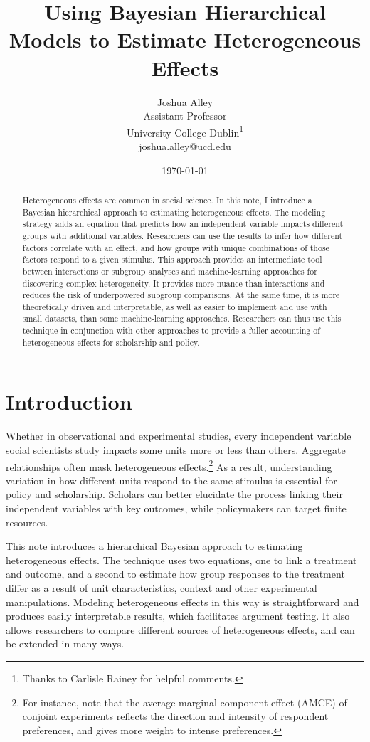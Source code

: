 \documentclass[12pt]{article}
\title{\textbf{Using Bayesian Hierarchical Models to Estimate Heterogeneous Effects}}
\author{Joshua Alley \\
Assistant Professor \\
University College Dublin\thanks{Thanks to Carlisle Rainey for helpful comments.} \\
joshua.alley@ucd.edu
}
\date{\today}
\begin{document}
\maketitle 

\begin{abstract} 
Heterogeneous effects are common in social science. 
In this note, I introduce a Bayesian hierarchical approach to estimating heterogeneous effects. 
The modeling strategy adds an equation that predicts how an independent variable impacts different groups with additional variables.
Researchers can use the results to infer how different factors correlate with an effect, and how groups with unique combinations of those factors respond to a given stimulus. 
This approach provides an intermediate tool between interactions or subgroup analyses and machine-learning approaches for discovering complex heterogeneity. 
It provides more nuance than interactions and reduces the risk of underpowered subgroup comparisons.
At the same time, it is more theoretically driven and interpretable, as well as easier to implement and use with small datasets, than some machine-learning approaches. 
Researchers can thus use this technique in conjunction with other approaches to provide a fuller accounting of heterogeneous effects for scholarship and policy.
\end{abstract} 


\newpage 
\doublespace 


\section{Introduction}


Whether in observational and experimental studies, every independent variable social scientists study impacts some units more or less than others. 
Aggregate relationships often mask heterogeneous effects.\footnote{For instance, \citet{Abramsonetal2022} note that the average marginal component effect (AMCE) of conjoint experiments reflects the direction and intensity of respondent preferences, and gives more weight to intense preferences.} 
As a result, understanding variation in how different units respond to the same stimulus is essential for policy and scholarship. 
Scholars can better elucidate the process linking their independent variables with key outcomes, while policymakers can target finite resources. 


This note introduces a hierarchical Bayesian approach to estimating heterogeneous effects. 
The technique uses two equations, one to link a treatment and outcome, and a second to estimate how group responses to the treatment differ as a result of unit characteristics, context and other experimental manipulations.
Modeling heterogeneous effects in this way is straightforward and produces easily interpretable results, which facilitates argument testing. 
It also allows researchers to compare different sources of heterogeneous effects, and can be extended in many ways.  
\end{document}
